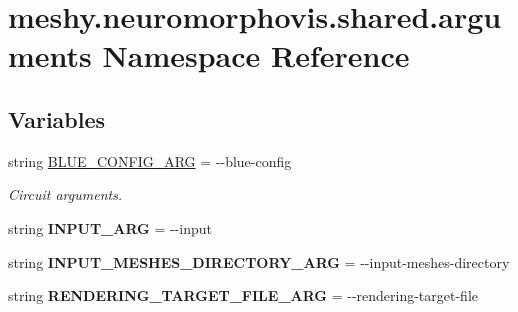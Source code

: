 \hypertarget{namespacemeshy_1_1neuromorphovis_1_1shared_1_1arguments}{}\section{meshy.\+neuromorphovis.\+shared.\+arguments Namespace Reference}
\label{namespacemeshy_1_1neuromorphovis_1_1shared_1_1arguments}
\subsection*{Variables}
\begin{DoxyCompactItemize}
\item 
string \hyperlink{namespacemeshy_1_1neuromorphovis_1_1shared_1_1arguments_aa221396329fb3a13c2b843ae31a52fec}{B\+L\+U\+E\+\_\+\+C\+O\+N\+F\+I\+G\+\_\+\+A\+RG} = \textquotesingle{}-\/-\/blue-\/config\textquotesingle{}\hypertarget{namespacemeshy_1_1neuromorphovis_1_1shared_1_1arguments_aa221396329fb3a13c2b843ae31a52fec}{}\label{namespacemeshy_1_1neuromorphovis_1_1shared_1_1arguments_aa221396329fb3a13c2b843ae31a52fec}

\begin{DoxyCompactList}\small\item\em Circuit arguments. \end{DoxyCompactList}\item 
string {\bfseries I\+N\+P\+U\+T\+\_\+\+A\+RG} = \textquotesingle{}-\/-\/input\textquotesingle{}\hypertarget{namespacemeshy_1_1neuromorphovis_1_1shared_1_1arguments_a117259cc22ded183f94844403de7ec7d}{}\label{namespacemeshy_1_1neuromorphovis_1_1shared_1_1arguments_a117259cc22ded183f94844403de7ec7d}

\item 
string {\bfseries I\+N\+P\+U\+T\+\_\+\+M\+E\+S\+H\+E\+S\+\_\+\+D\+I\+R\+E\+C\+T\+O\+R\+Y\+\_\+\+A\+RG} = \textquotesingle{}-\/-\/input-\/meshes-\/directory\textquotesingle{}\hypertarget{namespacemeshy_1_1neuromorphovis_1_1shared_1_1arguments_a7e12a916000d25d1c59a89d7112eeb4d}{}\label{namespacemeshy_1_1neuromorphovis_1_1shared_1_1arguments_a7e12a916000d25d1c59a89d7112eeb4d}

\item 
string {\bfseries R\+E\+N\+D\+E\+R\+I\+N\+G\+\_\+\+T\+A\+R\+G\+E\+T\+\_\+\+F\+I\+L\+E\+\_\+\+A\+RG} = \textquotesingle{}-\/-\/rendering-\/target-\/file\textquotesingle{}\hypertarget{namespacemeshy_1_1neuromorphovis_1_1shared_1_1arguments_aab4e7752048be9c3d82d851f22c3e08c}{}\label{namespacemeshy_1_1neuromorphovis_1_1shared_1_1arguments_aab4e7752048be9c3d82d851f22c3e08c}


\end{DoxyCompactItemize}
